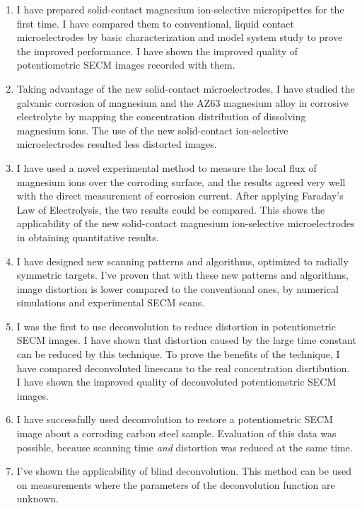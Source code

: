 \begin{enumerate}
\item I have prepared solid-contact magnesium ion-selective micropipettes for the first time.
I have compared them to conventional, liquid contact microelectrodes by basic characterization and model system study to prove the improved performance.
I have shown the improved quality of potentiometric SECM images recorded with them.

\item Taking advantage of the new solid-contact microelectrodes, I have studied the galvanic corrosion of magnesium and the AZ63 magnesium alloy in corrosive electrolyte by mapping the concentration distribution of dissolving magnesium ions.
The use of the new solid-contact ion-selective microelectrodes resulted less distorted images.

\item I have used a novel experimental method to measure the local flux of magnesium ions over the corroding surface, and the results agreed very well with the direct measurement of corrosion current.
After applying Faraday's Law of Electrolysis, the two results could be compared.
This shows the applicability of the new solid-contact magnesium ion-selective microelectrodes in obtaining quantitative results.

\newpage
\item I have designed new scanning patterns and algorithms, optimized to radially symmetric targets.
I've proven that with these new patterns and algorithms, image distortion is lower compared to the conventional ones, by numerical simulations and experimental SECM scans.

\item I was the first to use deconvolution to reduce distortion in potentiometric SECM images.
I have shown that distortion caused by the large time constant can be reduced by this technique.
To prove the benefits of the technique, I have compared deconvoluted linescans to the real concentration disrtibution.
I have shown the improved quality of deconvoluted potentiometric SECM images.

\item I have successfully used deconvolution to restore a potentiometric SECM image about a corroding carbon steel sample.
Evaluation of this data was possible, because scanning time \emph{and} distortion was reduced at the same time.

\item I've shown the applicability of blind deconvolution.
This method can be used on measurements where the parameters of the deconvolution function are unknown.


\end{enumerate}
